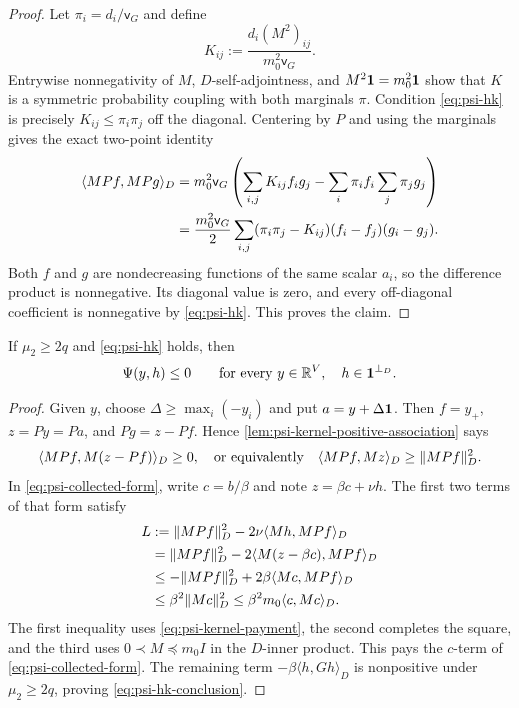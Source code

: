 \documentclass[11pt]{article}
\begin{document}
\begin{proof}
Let $\pi_i=d_i/\mathsf v_G$ and define
\begin{equation*}
 K_{ij}:=\frac{d_i(M^2)_{ij}}{m_0^2\mathsf v_G}.
\end{equation*}
Entrywise nonnegativity of $M$, $D$-self-adjointness, and
$M^2\mathbf{1}=m_0^2\mathbf{1}$ show that $K$ is a symmetric probability coupling with
both marginals $\pi$.  Condition \cref{eq:psi-hk} is precisely
$K_{ij}\leq\pi_i\pi_j$ off the diagonal.  Centering by $P$ and using the
marginals gives the exact two-point identity
\begin{align}
 \langle MPf,MPg\rangle_D
 &=m_0^2\mathsf v_G
   \left(\sum_{i,j}K_{ij}f_ig_j
        -\sum_i\pi_if_i\sum_j\pi_jg_j\right)\notag\\
 &=\frac{m_0^2\mathsf v_G}{2}
   \sum_{i,j}(\pi_i\pi_j-K_{ij})(f_i-f_j)(g_i-g_j).
 \label{eq:psi-two-point-kernel}
\end{align}
Both $f$ and $g$ are nondecreasing functions of the same scalar $a_i$, so
the difference product is nonnegative.  Its diagonal value is zero, and
every off-diagonal coefficient is nonnegative by \cref{eq:psi-hk}.  This
proves the claim.
\end{proof}

\begin{theorem}
\label{thm:psi-hk-nonpositivity}
If $\mu_2\geq2q$ and \cref{eq:psi-hk} holds, then
\begin{equation}
 \Psi(y,h)\leq0
 \qquad
 \text{for every }y\in\mathbb R^V,
 \quad h\in\mathbf{1}^{\perp_D}.
 \label{eq:psi-hk-conclusion}
\end{equation}
\end{theorem}

\begin{proof}
Given $y$, choose $\Delta\geq\max_i(-y_i)$ and put
$a=y+\Delta\mathbf{1}$.  Then $f=y_+$, $z=Py=Pa$, and
$Pg=z-Pf$.  Hence \cref{lem:psi-kernel-positive-association} says
\begin{equation}
 \langle MPf,M(z-Pf)\rangle_D\geq0,
 \quad\text{or equivalently}\quad
 \langle MPf,Mz\rangle_D\geq\lVert MPf\rVert_D^2.
 \label{eq:psi-kernel-payment}
\end{equation}
In \cref{eq:psi-collected-form}, write $c=b/\beta$ and note
$z=\beta c+\nu h$.  The first two terms of that form satisfy
\begin{align*}
 L
 &:=\lVert MPf\rVert_D^2-2\nu\langle Mh,MPf\rangle_D\\
 &=\lVert MPf\rVert_D^2-2\langle M(z-\beta c),MPf\rangle_D\\
 &\leq-\lVert MPf\rVert_D^2+2\beta\langle Mc,MPf\rangle_D\\
 &\leq\beta^2\lVert Mc\rVert_D^2
 \leq\beta^2m_0\langle c,Mc\rangle_D.
\end{align*}
The first inequality uses \cref{eq:psi-kernel-payment}, the second completes
the square, and the third uses $0\prec M\preceq m_0I$ in the
$D$-inner product.  This pays the $c$-term of
\cref{eq:psi-collected-form}.  The remaining term
$-\beta\langle h,Gh\rangle_D$ is nonpositive under
$\mu_2\geq2q$, proving \cref{eq:psi-hk-conclusion}.
\end{proof}
\end{document}
